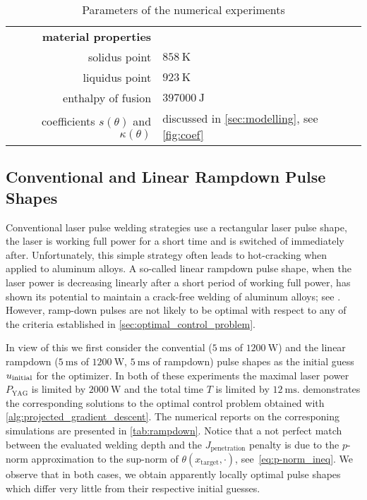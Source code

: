\begin{table}[ht]
\begin{tabular}{rl}
		\textbf{material properties} \\
		solidus point & $\SI{858}{\K}$ \\
		liquidus point & $\SI{923}{\K}$ \\
		enthalpy of fusion & $\SI{397000}{\J}$ \\
		coefficients $s(\theta)$ and $\kappa(\theta)$ & discussed in \cref{sec:modelling}, see \cref{fig:coef} \\
	\end{tabular}
	\caption{Parameters of the numerical experiments}
	\label{tab:parameters}
\end{table}

\subsection{Conventional and Linear Rampdown Pulse Shapes}

Conventional laser pulse welding strategies use a rectangular laser pulse shape, \ie the laser is working full power for a short time and is switched of immediately after. 
Unfortunately, this simple strategy often leads to hot-cracking when applied to aluminum alloys.
A so-called linear rampdown pulse shape, \ie when the laser power is decreasing linearly after a short period of working full power, has shown its potential to maintain a crack-free welding of aluminum alloys; see \cite{JiaZhangYuShiLiuWuYeWangTian:2021:1}.
However, ramp-down pulses are not likely to be optimal with respect to any of the criteria established in \cref{sec:optimal_control_problem}.

In view of this we first consider the convential ($\SI{5}{\ms}$ of $\SI{1200}{\W}$) and the linear rampdown ($\SI{5}{\ms}$ of $\SI{1200}{\W}$, $\SI{5}{\ms}$ of rampdown) pulse shapes as the initial guess $u_\textup{initial}$ for the optimizer. In both of these experiments the maximal laser power $P_\text{YAG}$ is limited by $\SI{2000}{\W}$ and the total time $T$ is limited by $\SI{12}{\ms}$.
 demonstrates the corresponding solutions to the optimal control problem obtained with \cref{alg:projected_gradient_descent}.
The numerical reports on the corresponing simulations are presented in \cref{tab:rampdown}. Notice that a not perfect match between the evaluated welding depth and the $J_\text{penetration}$ penalty is due to the $p$-norm approximation to the sup-norm of $\theta(x_\text{target}, \cdot)$, see~\eqref{eq:p-norm_ineq}.
We observe that in both cases, we obtain apparently locally optimal pulse shapes which differ very little from their respective initial guesses.


